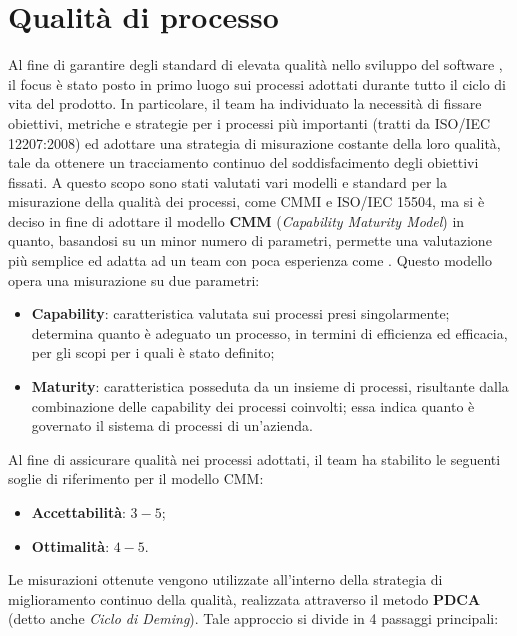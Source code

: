 \section{Qualità di processo}
\label{qualitaProcesso}
Al fine di garantire degli standard di elevata qualità nello sviluppo del software \progetto, il focus è stato posto in primo luogo sui processi adottati durante tutto il ciclo di vita del prodotto.
In particolare, il team ha individuato la necessità di fissare obiettivi, metriche e strategie per i processi più importanti (tratti da ISO/IEC 12207:2008) ed adottare una strategia di misurazione costante della loro qualità, tale da ottenere un tracciamento continuo del soddisfacimento degli obiettivi fissati.
A questo scopo sono stati valutati vari modelli e standard per la misurazione della qualità dei processi, come CMMI e ISO/IEC 15504, ma si è deciso in fine di adottare il modello \textbf{CMM} (\textit{Capability Maturity Model}) in quanto, basandosi su un minor numero di parametri, permette una valutazione più semplice ed adatta ad un team con poca esperienza come \gruppo.
Questo modello opera una misurazione su due parametri:
\begin{itemize}
\item \textbf{Capability}: caratteristica valutata sui processi presi singolarmente; determina quanto è adeguato un processo, in termini di efficienza ed efficacia, per gli scopi per i quali è stato definito;
\item \textbf{Maturity}: caratteristica posseduta da un insieme di processi, risultante dalla combinazione delle capability dei processi coinvolti; essa indica quanto è governato il sistema di processi di un'azienda.
\end{itemize}
Al fine di assicurare qualità nei processi adottati, il team ha stabilito le seguenti soglie di riferimento per il modello CMM:
\begin{itemize}
\item \textbf{Accettabilità}: $3 - 5$;
\item \textbf{Ottimalità}: $4 - 5$.
\end{itemize}
Le misurazioni ottenute vengono utilizzate all'interno della strategia di miglioramento continuo della qualità, realizzata attraverso il metodo \textbf{PDCA} (detto anche \textit{Ciclo di Deming}). Tale approccio si divide in 4 passaggi principali:
